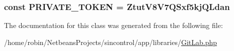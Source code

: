 \subsubsection[{P\+R\+I\+V\+A\+T\+E\+\_\+\+T\+O\+K\+E\+N}]{\setlength{\rightskip}{0pt plus 5cm}const P\+R\+I\+V\+A\+T\+E\+\_\+\+T\+O\+K\+E\+N = \textquotesingle{}Ztut\+V8\+V7\+Q\+Sxf5kj\+Q\+Ldan\textquotesingle{}}\label{class_git_lab_a7bd2a018127059c3e72902d45e7913d0}


The documentation for this class was generated from the following file\+:\begin{DoxyCompactItemize}
\item 
/home/robin/\+Netbeans\+Projects/sincontrol/app/libraries/\hyperlink{_git_lab_8php}{Git\+Lab.\+php}\end{DoxyCompactItemize}
